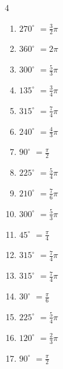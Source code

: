\begin{multicols}{4}
\begin{enumerate}
  \item $\displaystyle 270^{\circ}$
        $\displaystyle =\frac{3}{2}\pi$

  \item $\displaystyle 360^{\circ}$
        $\displaystyle =2\pi$

  \item $\displaystyle 300^{\circ}$
        $\displaystyle =\frac{5}{3}\pi$

\columnbreak %

  \item $\displaystyle 135^{\circ}$
        $\displaystyle =\frac{3}{4}\pi$

  \item $\displaystyle 315^{\circ}$
        $\displaystyle =\frac{7}{4}\pi$

  \item $\displaystyle 240^{\circ}$
        $\displaystyle =\frac{4}{3}\pi$

  \item $\displaystyle 90^{\circ}$
        $\displaystyle =\frac{\pi}{2}$

  \item $\displaystyle 225^{\circ}$
        $\displaystyle =\frac{5}{4}\pi$

  \item $\displaystyle 210^{\circ}$
        $\displaystyle =\frac{7}{6}\pi$

  \item $\displaystyle 300^{\circ}$
        $\displaystyle =\frac{5}{3}\pi$

  \item $\displaystyle 45^{\circ}$
        $\displaystyle =\frac{\pi}{4}$

  \item $\displaystyle 315^{\circ}$
        $\displaystyle =\frac{7}{4}\pi$

  \item $\displaystyle 315^{\circ}$
        $\displaystyle =\frac{7}{4}\pi$

  \item $\displaystyle 30^{\circ}$
        $\displaystyle =\frac{\pi}{6}$

  \item $\displaystyle 225^{\circ}$
        $\displaystyle =\frac{5}{4}\pi$

  \item $\displaystyle 120^{\circ}$
        $\displaystyle =\frac{2}{3}\pi$

  \item $\displaystyle 90^{\circ}$
        $\displaystyle =\frac{\pi}{2}$


\end{enumerate}
\end{multicols}
